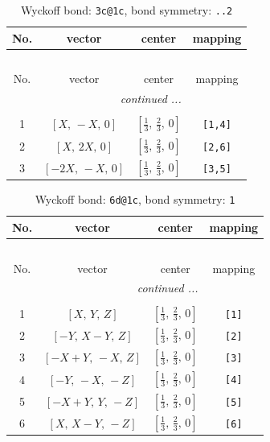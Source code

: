 \documentclass[fleqn,8pt]{jsarticle}
\begin{document}
\begin{longtable}{cccc}
\caption{Wyckoff bond: {\tt 3c@1c}, bond symmetry: {\tt ..2}}
 \\
 \hline \hline
No. & vector & center & mapping \\ \hline \endfirsthead

\multicolumn{3}{l}{\tablename\ \thetable{}} \\
 \hline \hline
No. & vector & center & mapping \\ \hline \endhead

 \hline \hline
\multicolumn{3}{r}{\footnotesize\it continued ...} \\ \endfoot

 \hline \hline
\multicolumn{3}{r}{} \\ \endlastfoot

1 & $\left[ X,\, - X,\, 0 \right]$ & $\left[ \frac{1}{3},\, \frac{2}{3},\, 0 \right]$ & {\tt [1,4]} \\ \hline
2 & $\left[ X,\, 2 X,\, 0 \right]$ & $\left[ \frac{1}{3},\, \frac{2}{3},\, 0 \right]$ & {\tt [2,6]} \\ \hline
3 & $\left[ - 2 X,\, - X,\, 0 \right]$ & $\left[ \frac{1}{3},\, \frac{2}{3},\, 0 \right]$ & {\tt [3,5]} \\
\end{longtable}
\renewcommand{\arraystretch}{1.2}
\begin{longtable}{cccc}
\caption{Wyckoff bond: {\tt 6d@1c}, bond symmetry: {\tt 1}}
 \\
 \hline \hline
No. & vector & center & mapping \\ \hline \endfirsthead

\multicolumn{3}{l}{\tablename\ \thetable{}} \\
 \hline \hline
No. & vector & center & mapping \\ \hline \endhead

 \hline \hline
\multicolumn{3}{r}{\footnotesize\it continued ...} \\ \endfoot

 \hline \hline
\multicolumn{3}{r}{} \\ \endlastfoot

1 & $\left[ X,\, Y,\, Z \right]$ & $\left[ \frac{1}{3},\, \frac{2}{3},\, 0 \right]$ & {\tt [1]} \\ \hline
2 & $\left[ - Y,\, X - Y,\, Z \right]$ & $\left[ \frac{1}{3},\, \frac{2}{3},\, 0 \right]$ & {\tt [2]} \\ \hline
3 & $\left[ - X + Y,\, - X,\, Z \right]$ & $\left[ \frac{1}{3},\, \frac{2}{3},\, 0 \right]$ & {\tt [3]} \\ \hline
4 & $\left[ - Y,\, - X,\, - Z \right]$ & $\left[ \frac{1}{3},\, \frac{2}{3},\, 0 \right]$ & {\tt [4]} \\ \hline
5 & $\left[ - X + Y,\, Y,\, - Z \right]$ & $\left[ \frac{1}{3},\, \frac{2}{3},\, 0 \right]$ & {\tt [5]} \\ \hline
6 & $\left[ X,\, X - Y,\, - Z \right]$ & $\left[ \frac{1}{3},\, \frac{2}{3},\, 0 \right]$ & {\tt [6]} \\
\end{longtable}
\end{document}
